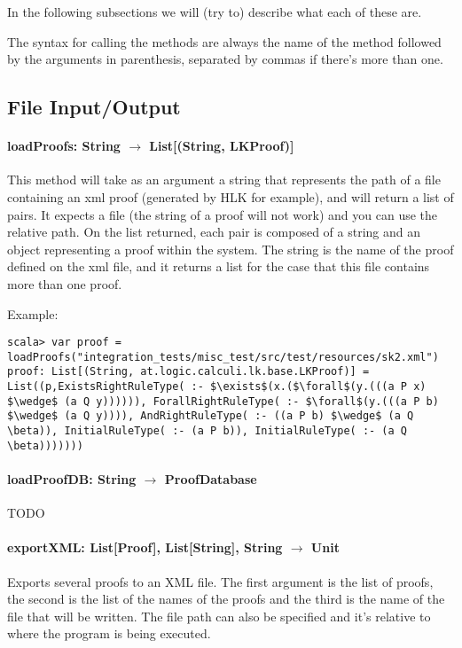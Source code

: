 \documentclass[a4paper, 11pt]{report}
\begin{document}
In the following subsections we will (try to) describe what each of these are.

The syntax for calling the methods are always the name of the method followed by
the arguments in parenthesis, separated by commas if there's more than one.

\subsection{File Input/Output}

\paragraph{\textbf{loadProofs: String $\rightarrow$ List[(String, LKProof)]}}
This method will take as an argument a string that represents the path of a file
containing an xml proof (generated by HLK for example), and will return a list 
of pairs. It expects a file (the string of a proof will not work) and you can use 
the relative path. On the list returned, each pair is composed of a string and 
an object representing a proof within the system. The string is the name of the 
proof defined on the xml file, and it returns a list for the case that this file
contains more than one proof.

Example:
\begin{lstlisting}[mathescape]
scala> var proof = loadProofs("integration_tests/misc_test/src/test/resources/sk2.xml")
proof: List[(String, at.logic.calculi.lk.base.LKProof)] = List((p,ExistsRightRuleType( :- $\exists$(x.($\forall$(y.(((a P x) $\wedge$ (a Q y)))))), ForallRightRuleType( :- $\forall$(y.(((a P b) $\wedge$ (a Q y)))), AndRightRuleType( :- ((a P b) $\wedge$ (a Q \beta)), InitialRuleType( :- (a P b)), InitialRuleType( :- (a Q \beta)))))))
\end{lstlisting}

\paragraph{\textbf{loadProofDB: String $\rightarrow$ ProofDatabase}}
{\color{red}TODO}

\paragraph{\textbf{exportXML: List[Proof], List[String], String $\rightarrow$ Unit}}
Exports several proofs to an XML file. The first argument is the list of proofs,
the second is the list of the names of the proofs and the third is the name of
the file that will be written. The file path can also be specified and it's
relative to where the program is being executed.
\end{document}
